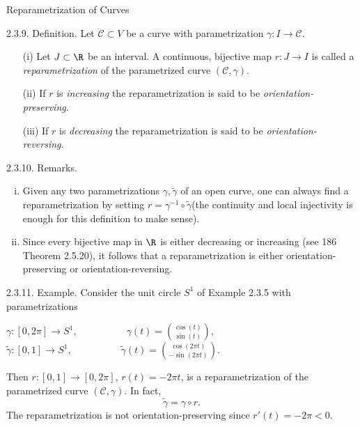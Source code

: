 \documentclass[smaller,hyperref={CJKbookmarks=true}]{beamer}
\begin{document}
\begin{frame}{Reparametrization of Curves}
\begin{spacing}{1.1}
\alert{2.3.9. Definition.} Let $\mathcal{C}\subset V$ be a curve with parametrization $\gamma:I\to\mathcal{C}$.
\begin{itemize}
  \item[(i)] Let $J\subset\R$ be an interval. A continuous, bijective map $r:J\to I$ is called a \emph{reparametrization} of the parametrized curve $(\mathcal{C},\gamma)$.
  \item[(ii)] If $r$ is \emph{increasing} the reparametrization is said to be \emph{orientation-preserving}.
  \item[(iii)] If $r$ is \emph{decreasing} the reparametrization is said to be \emph{orientation-reversing}.
\end{itemize}
\vspace*{12pt}
\alert{2.3.10. Remarks.}\\
\begin{enumerate}[(i)]
  \item Given any two parametrizations $\gamma,\widetilde{\gamma}$ of an open curve, one can always find a reparametrization by setting $r=\gamma^{-1}\circ\widetilde{\gamma}$(the
      continuity and local injectivity is enough for this definition to make sense).
  \item Since every bijective map in $\R$ is either decreasing or increasing (see 186 Theorem 2.5.20), it follows that a reparametrization is either orientation-preserving or orientation-reversing.
\end{enumerate}
\newpage
\alert{2.3.11. Example.} Consider the unit circle $S^1$ of Example 2.3.5 with parametrizations
\begin{center}
  $\displaystyle\gamma:[0,2\pi]\to S^1,\qquad\qquad\quad\gamma(t)=\binom{\cos(t)}{\sin(t)},$\\[6pt]
  $\displaystyle\widetilde{\gamma}:[0,1]\to S^1,\qquad\qquad\quad\widetilde{\gamma}(t)=\binom{\cos(2\pi t)}{-\sin(2\pi t)}$.
\end{center}
Then $r:[0,1]\to[0,2\pi],\,r(t)=-2\pi t$, is a reparametrization of the parametrized curve $(\mathcal{C},\gamma)$. In fact,
\[\widetilde{\gamma}=\gamma\circ r.\]
The reparametrization is not orientation-preserving since $r'(t)=-2\pi<0$.
\end{spacing}
\end{frame}
\end{document}
